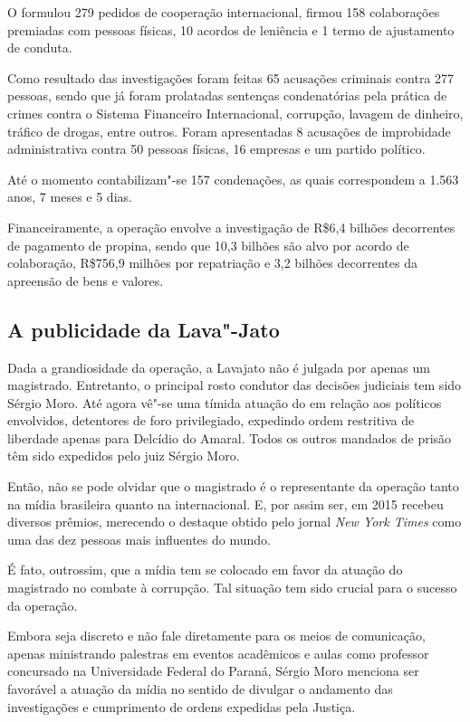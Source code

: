 O  formulou 279 pedidos de cooperação internacional, firmou 158
colaborações premiadas com pessoas físicas, 10 acordos de leniência e 1
termo de ajustamento de conduta.

Como resultado das investigações foram feitas 65 acusações criminais
contra 277 pessoas, sendo que já foram prolatadas sentenças
condenatórias pela prática de crimes contra o Sistema Financeiro
Internacional, corrupção, lavagem de dinheiro, tráfico de drogas, entre
outros. Foram apresentadas 8 acusações de improbidade administrativa
contra 50 pessoas físicas, 16 empresas e um partido político.

Até o momento contabilizam"-se 157 condenações, as quais correspondem a
1.563 anos, 7 meses e 5 dias.

Financeiramente, a operação envolve a investigação de R\$6,4 bilhões
decorrentes de pagamento de propina, sendo que 10,3 bilhões são alvo por
acordo de colaboração, R\$756,9 milhões por repatriação e 3,2
bilhões decorrentes da apreensão de bens e valores.

\subsection{A publicidade da Lava"-Jato}

Dada a grandiosidade da operação, a Lavajato não é julgada por apenas um
magistrado. Entretanto, o principal rosto condutor das decisões
judiciais tem sido Sérgio Moro. Até agora vê"-se uma tímida atuação do
 em relação aos políticos envolvidos, detentores de foro
privilegiado, expedindo ordem restritiva de liberdade apenas para
Delcídio do Amaral. Todos os outros mandados de prisão têm sido
expedidos pelo juiz Sérgio Moro.

Então, não se pode olvidar que o magistrado é o representante da
operação tanto na mídia brasileira quanto na internacional. E, por assim
ser, em 2015 recebeu diversos prêmios, merecendo o destaque obtido pelo
jornal \emph{New York Times} como uma das dez pessoas mais influentes do mundo.

É fato, outrossim, que a mídia tem se colocado em favor da atuação do
magistrado no combate à corrupção. Tal situação tem sido crucial para o
sucesso da operação.

Embora seja discreto e não fale diretamente para os meios de
comunicação, apenas ministrando palestras em eventos acadêmicos e aulas
como professor concursado na Universidade Federal do Paraná, Sérgio Moro
menciona ser favorável a atuação da mídia no sentido de divulgar o
andamento das investigações e cumprimento de ordens expedidas pela
Justiça.

